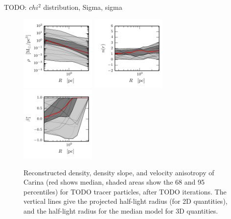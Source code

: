 TODO: $chi^2$ distribution, Sigma, sigma


\begin{figure}
    \begin{center}
        \includegraphics[width=0.33\textwidth]{fig/carina/prof_rho_0}
        \includegraphics[width=0.33\textwidth]{fig/carina/prof_nr_0}
        \includegraphics[width=0.33\textwidth]{fig/carina/prof_betastar_1}
        \caption{Reconstructed density, density slope, and velocity
          anisotropy of Carina (red shows median, shaded areas
          show the 68 and 95 percentiles) for TODO tracer particles, after
          TODO iterations. The vertical lines give the projected
          half-light radius (for 2D quantities), and the half-light
          radius for the median model for 3D quantities.}
        \label{fig:fornax}
    \end{center}
\end{figure}

